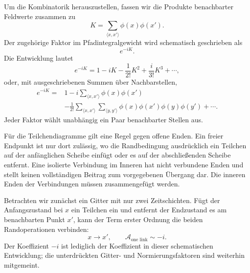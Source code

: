 Um die Kombinatorik herauszustellen, fassen wir die Produkte benachbarter Feldwerte zusammen zu
\begin{equation}
K=\sum_{\langle x,x'\rangle}\phi(x)\phi(x').
\end{equation}
Der zugehörige Faktor im Pfadintegralgewicht wird schematisch geschrieben als
\begin{equation}
e^{-iK}.
\end{equation}
Die Entwicklung lautet
\begin{equation}
e^{-iK}
=1-iK-\frac{1}{2!}K^2+\frac{i}{3!}K^3+\cdots,
\end{equation}
oder, mit ausgeschriebenen Summen über Nachbarstellen,
\begin{align}
e^{-iK}
={}&1
-i\sum_{\langle x,x'\rangle}\phi(x)\phi(x')
\nonumber\\
&-\frac{1}{2!}
\sum_{\langle x,x'\rangle}
\sum_{\langle y,y'\rangle}
\phi(x)\phi(x')\phi(y)\phi(y')
+\cdots .
\end{align}
Jeder Faktor wählt unabhängig ein Paar benachbarter Stellen aus.

Für die Teilchendiagramme gilt eine Regel gegen offene Enden. Ein freier Endpunkt ist nur dort zulässig, wo die Randbedingung ausdrücklich ein Teilchen auf der anfänglichen Scheibe einfügt oder es auf der abschließenden Scheibe entfernt. Eine isolierte Verbindung im Inneren hat nicht verbundene Enden und stellt keinen vollständigen Beitrag zum vorgegebenen Übergang dar. Die inneren Enden der Verbindungen müssen zusammengefügt werden.

Betrachten wir zunächst ein Gitter mit nur zwei Zeitschichten. Fügt der Anfangszustand bei \(x\) ein Teilchen ein und entfernt der Endzustand es am benachbarten Punkt \(x'\), kann der Term erster Ordnung die beiden Randoperationen verbinden:
\begin{equation}
x\longrightarrow x',
\qquad
\mathcal{A}_{\text{one link}}\sim -i.
\end{equation}
Der Koeffizient \(-i\) ist lediglich der Koeffizient in dieser schematischen Entwicklung; die unterdrückten Gitter- und Normierungsfaktoren sind weiterhin mitgemeint.

\begin{classroomqa}
\end{classroomqa}

